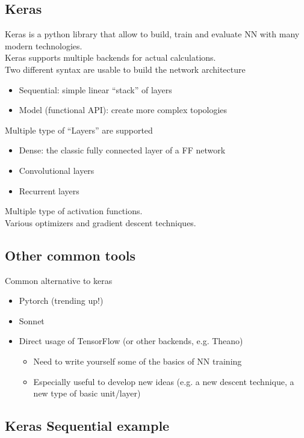 \subsection{Keras}

Keras is a python library that allow to build, train and evaluate NN with many modern technologies.\\
Keras supports multiple backends for actual calculations.\\
Two different syntax are usable to build the network architecture
\begin{itemize}
	\item Sequential: simple linear “stack” of layers
	\item Model (functional API): create more complex topologies
\end{itemize}

Multiple type of “Layers” are supported

\begin{itemize}
	\item Dense: the classic fully connected layer of a FF network
	\item Convolutional layers
	\item Recurrent layers
\end{itemize}

Multiple type of activation functions.\\
Various optimizers and gradient descent techniques.

\subsection{Other common tools}

Common alternative to keras

\begin{itemize}
	\item Pytorch (trending up!) 
	\item Sonnet 
	\item Direct usage of TensorFlow (or other backends, e.g. Theano)
	\begin{itemize}
		\item Need to write yourself some of the basics of NN training
		\item Especially useful to develop new ideas (e.g. a new descent technique, a new type of basic unit/layer)
	\end{itemize}
\end{itemize}

\subsection{Keras Sequential example}

